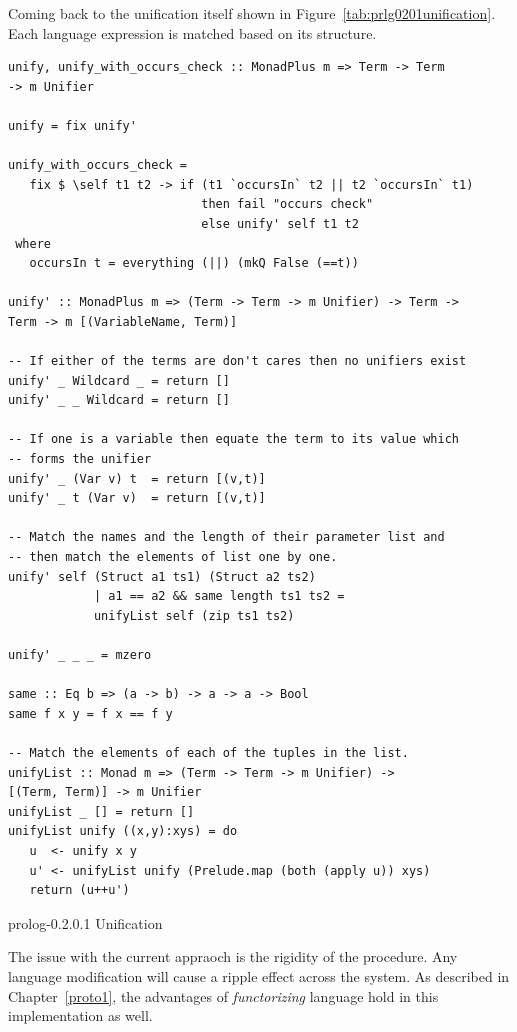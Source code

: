 \documentclass[thesis-solanki.tex]{subfiles}
\begin{document}
\clearpage

Coming back to the unification itself shown in Figure~\ref{tab:prlg0201unification}. Each language expression is matched based on its 
structure.
  
\begin{code-list}[h]
\begin{verbatim}
unify, unify_with_occurs_check :: MonadPlus m => Term -> Term
-> m Unifier

unify = fix unify'

unify_with_occurs_check =
   fix $ \self t1 t2 -> if (t1 `occursIn` t2 || t2 `occursIn` t1)
                           then fail "occurs check"
                           else unify' self t1 t2
 where
   occursIn t = everything (||) (mkQ False (==t))

unify' :: MonadPlus m => (Term -> Term -> m Unifier) -> Term ->
Term -> m [(VariableName, Term)]

-- If either of the terms are don't cares then no unifiers exist
unify' _ Wildcard _ = return []
unify' _ _ Wildcard = return []

-- If one is a variable then equate the term to its value which
-- forms the unifier
unify' _ (Var v) t  = return [(v,t)]
unify' _ t (Var v)  = return [(v,t)]

-- Match the names and the length of their parameter list and
-- then match the elements of list one by one.
unify' self (Struct a1 ts1) (Struct a2 ts2)
            | a1 == a2 && same length ts1 ts2 =
            unifyList self (zip ts1 ts2)

unify' _ _ _ = mzero

same :: Eq b => (a -> b) -> a -> a -> Bool
same f x y = f x == f y

-- Match the elements of each of the tuples in the list.
unifyList :: Monad m => (Term -> Term -> m Unifier) ->
[(Term, Term)] -> m Unifier
unifyList _ [] = return []
unifyList unify ((x,y):xys) = do
   u  <- unify x y
   u' <- unifyList unify (Prelude.map (both (apply u)) xys)
   return (u++u')
\end{verbatim} 
\caption{prolog-0.2.0.1 Unification}
\label{tab:prlg0201unification}
\end{code-list}

The issue with the current appraoch is the rigidity of the procedure. Any language modification will cause a ripple effect across the 
system. As described in Chapter~\ref{proto1}, the advantages of \textit{functorizing} language hold in this implementation as well.
\end{document}
